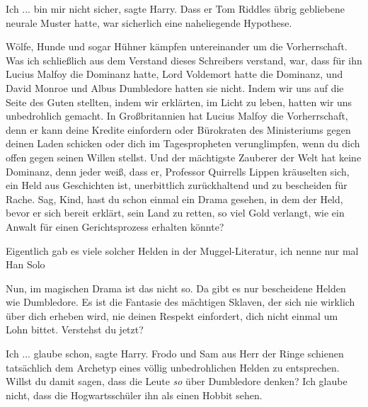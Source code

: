 \glqq{}Ich ... bin mir nicht sicher\grqq{}, sagte Harry. Dass er Tom Riddles
übrig gebliebene neurale Muster hatte, war sicherlich eine naheliegende
Hypothese.

\glqq{}Wölfe, Hunde und sogar Hühner kämpfen untereinander um die Vorherrschaft.
Was ich schließlich aus dem Verstand dieses Schreibers verstand, war, dass für
ihn Lucius Malfoy die Dominanz hatte, Lord Voldemort hatte die Dominanz, und
David Monroe und Albus Dumbledore hatten sie nicht. Indem wir uns auf die Seite
des Guten stellten, indem wir erklärten, im Licht zu leben, hatten wir uns
unbedrohlich gemacht. In Großbritannien hat Lucius Malfoy die Vorherrschaft,
denn er kann deine Kredite einfordern oder Bürokraten des Ministeriums gegen
deinen Laden schicken oder dich im Tagespropheten verunglimpfen, wenn du dich
offen gegen seinen Willen stellst. Und der mächtigste Zauberer der Welt hat
keine Dominanz, denn jeder weiß, dass er\grqq{}, Professor Quirrells Lippen
kräuselten sich, \glqq{}ein Held aus Geschichten ist, unerbittlich zurückhaltend
und zu bescheiden für Rache. Sag, Kind, hast du schon einmal ein Drama gesehen,
in dem der Held, bevor er sich bereit erklärt, sein Land zu retten, so viel Gold
verlangt, wie ein Anwalt für einen Gerichtsprozess erhalten könnte?\grqq{}

\glqq{}Eigentlich gab es viele solcher Helden in der Muggel-Literatur, ich nenne
nur mal Han Solo\grqq{}

\glqq{}Nun, im magischen Drama ist das nicht so. Da gibt es nur bescheidene
Helden wie Dumbledore. Es ist die Fantasie des mächtigen Sklaven, der sich nie
wirklich über dich erheben wird, nie deinen Respekt einfordert, dich nicht
einmal um Lohn bittet. Verstehst du jetzt?\grqq{}

\glqq{}Ich ... glaube schon\grqq{}, sagte Harry. Frodo und Sam aus Herr der Ringe
schienen tatsächlich dem Archetyp eines völlig unbedrohlichen Helden zu
entsprechen. \glqq{}Willst du damit sagen, dass die Leute \emph{so} über
Dumbledore denken? Ich glaube nicht, dass die Hogwartsschüler ihn als einen
Hobbit sehen.\grqq{}

